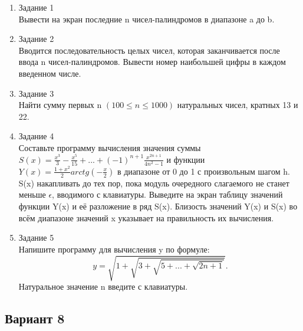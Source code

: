 \documentclass[a4paper]{article}
\begin{document}
	\begin{enumerate} 
		\item Задание 1 \\
			Вывести на экран последние n чисел-палиндромов в диапазоне a до b.\\
		\item Задание 2\\
			Вводится последовательность целых чисел, которая заканчивается после ввода n чисел-палиндромов.
			 Вывести номер наибольшей цифры в каждом введенном числе.\\
		\item Задание 3 \\
			Найти сумму первых n $(100 \le n \le 1000) $ натуральных чисел, кратных 13 и 22.\\
		\item Задание 4 \\
			Составьте программу вычисления значения суммы  $S(x)=\frac{x^3}{3}-\frac{x^5}{15}+...+(-1)^{n+1}\frac{x^{2n+1}}{4n^2-1}$
			и функции $Y(x)=\frac{1+x^2}{2}arctg(-\frac{x}{2})$ в диапазоне от 0 до 1
			с произвольным шагом h.  S(x) накапливать до тех пор, пока модуль очередного слагаемого не станет меньше $\epsilon$, вводимого с клавиатуры. Выведите на экран таблицу значений функции Y(x) и её разложение в ряд S(x). Близость значений Y(x) и S(x) во всём диапазоне
			значений x указывает на правильность их вычисления.\\
		\item Задание 5 \\
			Напишите программу для вычисления y по формуле:
			$$y=\sqrt{1+\sqrt{3+\sqrt{5+...+\sqrt{2n+1}}}}.$$
			Натуральное значение n введите с клавиатуры.\\
	\end{enumerate}
	\newpage
	\begin{center}
		\subsection*{Вариант 8}
	\end{center}
\end{document}
